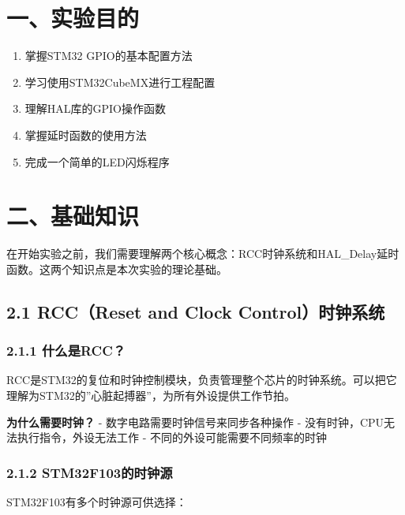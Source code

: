 \documentclass[
  chinese,
  UTF8,
  oneside,
  openany]{ctexbook}
\providecommand{\tightlist}{%
  \setlength{\itemsep}{0pt}\setlength{\parskip}{0pt}}
\begin{document}
\section{一、实验目的}\label{ux4e00ux5b9eux9a8cux76eeux7684}

\begin{enumerate}
\def\labelenumi{\arabic{enumi}.}
\tightlist
\item
  掌握STM32 GPIO的基本配置方法
\item
  学习使用STM32CubeMX进行工程配置
\item
  理解HAL库的GPIO操作函数
\item
  掌握延时函数的使用方法
\item
  完成一个简单的LED闪烁程序
\end{enumerate}

\section{二、基础知识}\label{ux4e8cux57faux7840ux77e5ux8bc6}

在开始实验之前，我们需要理解两个核心概念：RCC时钟系统和HAL\_Delay延时函数。这两个知识点是本次实验的理论基础。

\subsection{2.1 RCC（Reset and Clock
Control）时钟系统}\label{rccreset-and-clock-controlux65f6ux949fux7cfbux7edf}

\subsubsection{2.1.1 什么是RCC？}\label{ux4ec0ux4e48ux662frcc}

RCC是STM32的复位和时钟控制模块，负责管理整个芯片的时钟系统。可以把它理解为STM32的''心脏起搏器''，为所有外设提供工作节拍。

\textbf{为什么需要时钟？} - 数字电路需要时钟信号来同步各种操作 -
没有时钟，CPU无法执行指令，外设无法工作 -
不同的外设可能需要不同频率的时钟

\subsubsection{2.1.2
STM32F103的时钟源}\label{stm32f103ux7684ux65f6ux949fux6e90}

STM32F103有多个时钟源可供选择：
\end{document}
